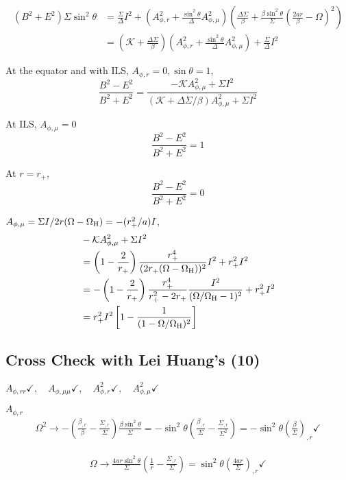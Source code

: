 \documentclass[aps,prd,preprint,groupedaddress]{revtex4-1}
\def\nn{\nonumber}
\def\beq{\begin{equation}}
\def\eeq{\end{equation}}
\def\sst{\sin^2\theta}
\def\Ar{A_{\phi,r}}
\def\Arr{A_{\phi,rr}}
\def\Am{A_{\phi,\mu}}
\def\Amm{A_{\phi,\mu\mu}}
\def\WH{\Omega_{\rm H}}
\begin{document}
\begin{align}
    (B^2+E^2)\Sigma\sst
    &= \frac{\Sigma}{\Delta}I^2 + \left(\Ar^2 + \frac{\sst}{\Delta}\Am^2\right)\left(\frac{\Delta\Sigma}{\beta}
    +\frac{\beta\sst}{\Sigma}\left(\frac{2ar}{\beta}-\Omega \right)^2\right) \nn \\
    &= \left(\mathcal K + \frac{\Delta\Sigma}{\beta}\right) \left(\Ar^2 + \frac{\sst}{\Delta}\Am^2 \right) + \frac{\Sigma}{\Delta}I^2
\end{align}


At the equator and with ILS, $\Ar = 0, \sin\theta = 1$,
\beq
\frac{B^2-E^2}{B^2+E^2} = \frac{-\mathcal K \Am^2 + {\Sigma}I^2}{\left(\mathcal K + \Delta\Sigma/\beta\right)\Am^2 + {\Sigma}I^2 }
\eeq

At ILS, $\Am = 0$
\beq
\frac{B^2-E^2}{B^2+E^2} = 1
\eeq

At $r = r_+$,
\beq
\frac{B^2-E^2}{B^2+E^2} = 0
\eeq

$\Am = \Sigma I / 2r(\Omega-\WH) = - (r_+^2 /a) I $,
\begin{align}
&-\mathcal K \Am^2 + {\Sigma}I^2 \\
&= \left(1-\frac{2}{r_+}\right)\frac{r_+^4}{(2r_+(\Omega-\WH))^2} I ^2 + r_+^2 I^2 \\
&=-\left(1-\frac{2}{r_+}\right)\frac{r_+^4}{r_+^2-2r_+} \frac{I ^2}{(\Omega/\WH-1)^2} + r_+^2 I^2 \\
&= r_+^2 I^2 \left[1-\frac{1}{(1-\Omega/\WH)^2} \right]
\end{align}
\subsection{Cross Check with Lei Huang's (10)}
$\Arr \checkmark, \quad \Amm \checkmark, \quad \Ar^2 \checkmark, \quad \Am^2 \checkmark$

$\Ar$
\begin{align}
\Omega^2 \rightarrow
-\left(\frac{\beta_{,r}}{\beta} - \frac{\Sigma_{,r}}{\Sigma} \right)\frac{\beta \sst}{\Sigma}
= -\sst \left(\frac{\beta_{,r}}{\Sigma} - \frac{\Sigma_{,r}}{\Sigma^2} \right)
= -\sst \left(\frac{\beta}{\Sigma}\right)_{,r} \checkmark
\end{align}

\begin{align}
\Omega \rightarrow
\frac{4ar\sst}{\Sigma}  \left(\frac{1}{r}-\frac{\Sigma_{,r}}{\Sigma} \right)
= \sst\left(\frac{4ar}{\Sigma}\right)_{,r} \checkmark
\end{align}
\end{document}
